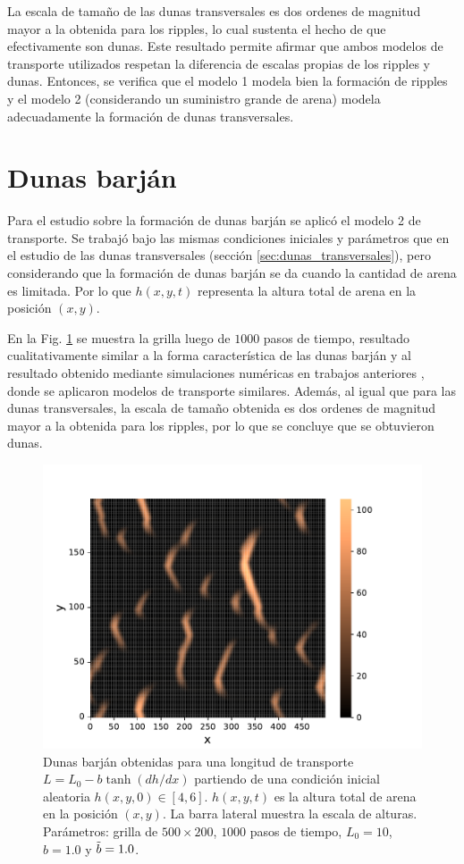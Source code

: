 \documentclass[11pt,twocolumn,twoside]{opticajnl}
\begin{document}
La escala de tamaño de las dunas transversales es dos ordenes de magnitud mayor a la obtenida para los ripples, lo cual sustenta el hecho de que efectivamente son dunas. Este resultado permite afirmar que ambos modelos de transporte utilizados respetan la diferencia de escalas propias de los ripples y dunas. Entonces, se verifica que el modelo 1 modela bien la formación de ripples y el modelo 2 (considerando un suministro grande de arena) modela adecuadamente la formación de dunas transversales.

\section{Dunas barján}

Para el estudio sobre la formación de dunas barján se aplicó el modelo 2 de transporte. Se trabajó bajo las mismas condiciones iniciales y parámetros que en el estudio de las dunas transversales (sección \ref{sec:dunas_transversales}), pero considerando que la formación de dunas barján se da cuando la cantidad de arena es limitada. Por lo que $h(x,y,t)$ representa la altura total de arena en la  posición $(x,y)$. 

En la Fig. \ref{fig:muchos_barchanes} se muestra la grilla luego de $1000$ pasos de tiempo, resultado cualitativamente similar a la forma característica de las dunas barján y al resultado obtenido mediante simulaciones numéricas en trabajos anteriores \cite{nishimori_formation_1993}, donde se aplicaron modelos de transporte similares. Además, al igual que para las dunas transversales, la escala de tamaño obtenida es dos ordenes de magnitud mayor a la obtenida para los ripples, por lo que se concluye que se obtuvieron dunas. 

\begin{figure}[H]
\centering
\includegraphics[width=\linewidth]{Figuras/muchos_barchanes.pdf}
\caption{\centering Dunas barján obtenidas para una longitud de transporte $L = L_0 - b \tanh{ (dh/dx) }$ partiendo de una condición inicial aleatoria $h(x,y,0) \in [4,6]$. $h(x,y,t)$ es la altura total de arena en la posición $(x,y)$. La barra lateral muestra la escala de alturas. Parámetros: grilla de $500 \times 200$, $1000$ pasos de tiempo, $L_0 = 10$, $b=1.0$ y $\Tilde{b}=1.0$.}
\label{fig:muchos_barchanes}
\end{figure}
\end{document}
